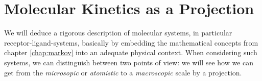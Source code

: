 \section{Molecular Kinetics as a Projection}
\label{sec:projection}

We will deduce a rigorous description of molecular systems, in particular receptor-ligand-systems, basically by embedding the mathematical concepts from chapter \ref{chap:markov} into an adequate physical context.
When considering such systems, we can distinguish between two points of view: we will see how we can get from the \textit{microsopic} or \textit{atomistic} to a  \textit{macroscopic} scale by a projection.



